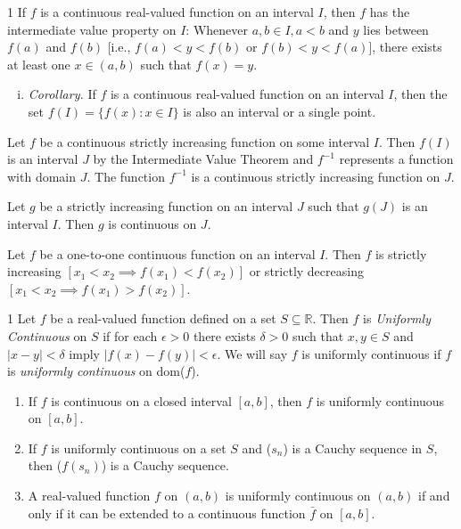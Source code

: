 \begin{theo}{1}
	If $f$ is a continuous real-valued function on an interval $I$, then $f$ has
	the intermediate value property on $I$: Whenever $a, b \in I, a < b$ and $y$
	lies between $f(a)$ and $f(b)$ [i.e., $f(a) < y < f(b)$ or $f(b) < y < f(a)$],
	there exists at least one $x \in (a, b)$ such that $f(x) = y$.
	\begin{enumerate}[(i)]
		\item \textit{Corollary.} If $f$ is a continuous real-valued function on an interval $I$, then the set $f(I) = \{f(x) : x \in I\}$ is also an interval or a single point.
	\end{enumerate}
\end{theo}

\begin{theo}{1}
	Let $f$ be a continuous strictly increasing function on some interval $I$. Then $f(I)$ is an interval $J$ by the Intermediate Value Theorem and $f^{−1}$ represents a function with domain $J$. The function $f^{−1}$ is a continuous strictly increasing function on $J$.
\end{theo}

\begin{theo}{1}
	Let $g$ be a strictly increasing function on an interval $J$ such that $g(J)$ is an interval $I$. Then $g$ is continuous on $J$.
\end{theo}

\begin{theo}{1}
	Let $f$ be a one-to-one continuous function on an interval $I$. Then
	$f$ is strictly increasing $[x_1 < x_2 \implies f(x_1) < f(x_2)]$ or strictly
	decreasing $[x_1 < x_2 \implies f(x_1) > f(x_2)]$.
\end{theo}

\newpage

\begin{defn}{1}
	Let $f$ be a real-valued function defined on a set $S \subseteq \mathbb{R}$. Then $f$ is \textit{Uniformly Continuous} on $S$ if for each $\epsilon > 0$ there exists $\delta > 0$ such that $x, y \in S$ and $|x-y| < \delta$ imply $|f(x)- f(y)| < \epsilon$. We will say $f$ is uniformly continuous if $f$ is \textit{uniformly continuous} on dom($f$).
	\begin{enumerate}
		\item If $f$ is continuous on a closed interval $[a, b]$, then $f$ is uniformly continuous on $[a, b]$.
		\item If $f$ is uniformly continuous on a set $S$ and ($s_n$) is a Cauchy sequence in $S$, then ($f(s_n)$) is a Cauchy sequence.
		\item A real-valued function $f$ on $(a, b)$ is uniformly continuous on $(a, b)$ if and only if it can be extended to a continuous function $\bar{f}$ on $[a, b]$.
	\end{enumerate}
\end{defn}



